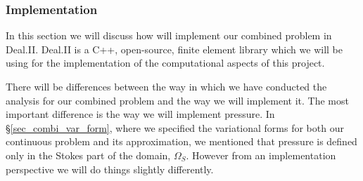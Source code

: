 \documentclass[12pt,a4paper]{article}
\theoremstyle{definition}
\begin{document}
 \subsubsection{Implementation}\label{sec_combi_implementation}
In this section we will discuss how will implement our combined problem in Deal.II.   Deal.II is a C++, open-source, finite element library which we will be using for the implementation of the computational aspects of this project.   

There will be differences between the way in which we have conducted the analysis for our combined problem and the way we will implement it.  The most important difference is the way we will implement pressure.  In \S \ref{sec_combi_var_form}, where we specified the variational forms for both our continuous problem and its approximation, we mentioned that pressure is defined only in the Stokes part of the domain, $\Omega_S$.  However from an implementation perspective we will do things slightly differently.
\end{document}
